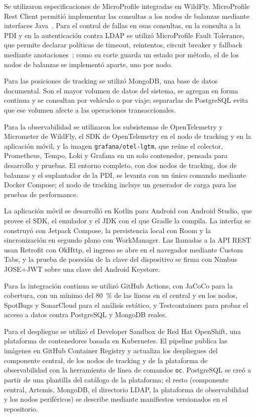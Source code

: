 Se utilizaron especificaciones de MicroProfile integradas en WildFly. MicroProfile Rest Client permitió implementar las consultas a los nodos de balanzas mediante interfaces Java~\cite{MicroProfileRestClient40}. Para el control de fallas en esas consultas, en la consulta a la PDI y en la autenticación contra LDAP se utilizó MicroProfile Fault Tolerance, que permite declarar políticas de timeout, reintentos, circuit breaker y fallback mediante anotaciones~\cite{MicroProfileFaultTolerance41}; como su corte guarda un estado por método, el de los nodos de balanzas se implementó aparte, uno por nodo.

Para las posiciones de tracking se utilizó MongoDB, una base de datos documental. Son el mayor volumen de datos del sistema, se agregan en forma continua y se consultan por vehículo o por viaje; separarlas de PostgreSQL evita que ese volumen afecte a las operaciones transaccionales.

Para la observabilidad se utilizaron los subsistemas de OpenTelemetry y Micrometer de WildFly, el SDK de OpenTelemetry en el nodo de tracking y en la aplicación móvil, y la imagen \texttt{grafana/otel-lgtm}, que reúne el colector, Prometheus, Tempo, Loki y Grafana en un solo contenedor, pensada para desarrollo y pruebas. El entorno completo, con dos nodos de tracking, dos de balanzas y el suplantador de la PDI, se levanta con un único comando mediante Docker Compose; el nodo de tracking incluye un generador de carga para las pruebas de performance.

La aplicación móvil se desarrolló en Kotlin para Android con Android Studio, que provee el SDK, el emulador y el JDK con el que Gradle la compila. La interfaz se construyó con Jetpack Compose, la persistencia local con Room y la sincronización en segundo plano con WorkManager. Las llamadas a la API REST usan Retrofit con OkHttp, el ingreso se abre en el navegador mediante Custom Tabs, y la prueba de posesión de la clave del dispositivo se firma con Nimbus JOSE+JWT sobre una clave del Android Keystore.

Para la integración continua se utilizó GitHub Actions, con JaCoCo para la cobertura, con un mínimo del 80~\% de las líneas en el central y en los nodos, SpotBugs y SonarCloud para el análisis estático, y Testcontainers para probar el acceso a datos contra PostgreSQL y MongoDB reales.

Para el despliegue se utilizó el Developer Sandbox de Red Hat OpenShift, una plataforma de contenedores basada en Kubernetes. El pipeline publica las imágenes en GitHub Container Registry y actualiza los despliegues del componente central, de los nodos de tracking y de la plataforma de observabilidad con la herramienta de línea de comandos \texttt{oc}. PostgreSQL se creó a partir de una plantilla del catálogo de la plataforma; el resto (componente central, Artemis, MongoDB, el directorio LDAP, la plataforma de observabilidad y los nodos periféricos) se describe mediante manifiestos versionados en el repositorio.

